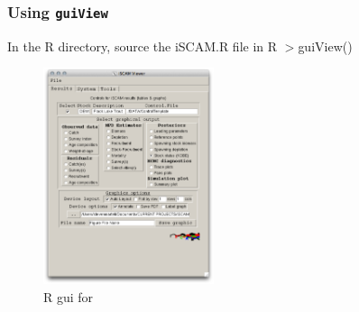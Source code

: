 \begin{frame}
	\frametitle{Using \texttt{guiView}} In the R directory, source the iSCAM.R file in R $>$guiView() 
	\begin{figure}
		[htbp] \centering 
		\includegraphics[height=2.5in]{screenCaptures/guiView.pdf} \caption{R gui for \iscam} \label{fig:screenCaptures_guiView} 
	\end{figure}
\end{frame}

